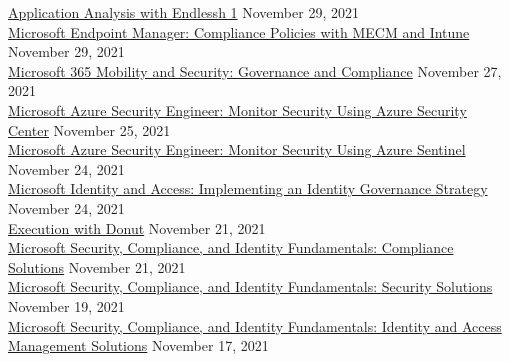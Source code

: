\documentclass[10pt]{res} %
\begin{document}
\begin{resume}
\href{https://bjdelacruz.dev/files/certificates/pluralsight/20_Application_Analysis_with_Endlessh_1.pdf}{\color{blue}Application Analysis with Endlessh 1} \hfill November 29, 2021 \\
\href{https://bjdelacruz.dev/files/certificates/pluralsight/13_Microsoft_Endpoint_Manager_Compliance_Policies_with_MECM_and_Intune.pdf}{\color{blue}Microsoft Endpoint Manager: Compliance Policies with MECM and Intune} \hfill November 29, 2021 \\
\href{https://bjdelacruz.dev/files/certificates/pluralsight/Microsoft_365_Mobility_and_Security_Governance_and_Compliance.pdf}{\color{blue}Microsoft 365 Mobility and Security: Governance and Compliance} \hfill November 27, 2021 \\
\href{https://bjdelacruz.dev/files/certificates/pluralsight/10_Microsoft_Azure_Security_Engineer_Monitor_Security_Using_Azure_Security_Center.pdf}{\color{blue}Microsoft Azure Security Engineer: Monitor Security Using Azure Security Center} \hfill November 25, 2021 \\
\href{https://bjdelacruz.dev/files/certificates/pluralsight/11_Microsoft_Azure_Security_Engineer_Monitor_Security_Using_Azure_Sentinel.pdf}{\color{blue}Microsoft Azure Security Engineer: Monitor Security Using Azure Sentinel} \hfill November 24, 2021 \\
\href{https://bjdelacruz.dev/files/certificates/pluralsight/Microsoft_Identity_and_Access_Implementing_an_Identity_Governance_Strategy.pdf}{\color{blue}Microsoft Identity and Access: Implementing an Identity Governance Strategy} \hfill November 24, 2021 \\
\href{https://bjdelacruz.dev/files/certificates/pluralsight/21_Execution_with_Donut.pdf}{\color{blue}Execution with Donut} \hfill November 21, 2021 \\
\href{https://bjdelacruz.dev/files/certificates/pluralsight/4_Microsoft_Security_Compliance_and_Identity_Fundamentals_Compliance_Solutions.pdf}{\color{blue}Microsoft Security, Compliance, and Identity Fundamentals: Compliance Solutions} \hfill November 21, 2021 \\
\href{https://bjdelacruz.dev/files/certificates/pluralsight/3_Microsoft_Security_Compliance_and_Identity_Fundamentals_Security_Solutions.pdf}{\color{blue}Microsoft Security, Compliance, and Identity Fundamentals: Security Solutions} \hfill November 19, 2021 \\
\href{https://bjdelacruz.dev/files/certificates/pluralsight/2_Microsoft_Security_Compliance_and_Identity_Fundamentals_Identity_and_Access_Management_Solutions.pdf}{\color{blue}Microsoft Security, Compliance, and Identity Fundamentals: Identity and Access Management Solutions} \hfill November 17, 2021 \\

\end{resume}
\end{document}
